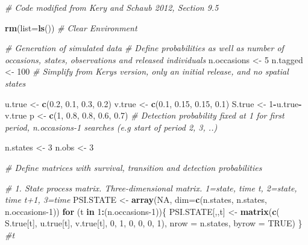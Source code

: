 \documentclass[
]{krantz}
\makeatletter
\newenvironment{Shaded}{\begin{snugshade}}{\end{snugshade}}
\newcommand{\AttributeTok}[1]{\textcolor[rgb]{0.27,0.27,0.27}{#1}}
\newcommand{\CommentTok}[1]{\textcolor[rgb]{0.37,0.37,0.37}{\textit{#1}}}
\newcommand{\ConstantTok}[1]{\textcolor[rgb]{0.37,0.37,0.37}{#1}}
\newcommand{\ControlFlowTok}[1]{\textcolor[rgb]{0.27,0.27,0.27}{\textbf{#1}}}
\newcommand{\DecValTok}[1]{\textcolor[rgb]{0.06,0.06,0.06}{#1}}
\newcommand{\FloatTok}[1]{\textcolor[rgb]{0.06,0.06,0.06}{#1}}
\newcommand{\FunctionTok}[1]{\textcolor[rgb]{0.27,0.27,0.27}{\textbf{#1}}}
\newcommand{\NormalTok}[1]{#1}
\newcommand{\OtherTok}[1]{\textcolor[rgb]{0.37,0.37,0.37}{#1}}
\newcommand{\SpecialCharTok}[1]{\textcolor[rgb]{0.43,0.43,0.43}{\textbf{#1}}}
\newenvironment{kframe}{%
\medskip{}
\setlength{\fboxsep}{.8em}
 \def\at@end@of@kframe{}%
 \ifinner\ifhmode%
  \def\at@end@of@kframe{\end{minipage}}%
  \begin{minipage}{\columnwidth}%
 \fi\fi%
 \def\FrameCommand##1{\hskip\@totalleftmargin \hskip-\fboxsep
 \colorbox{shadecolor}{##1}\hskip-\fboxsep
     \hskip-\linewidth \hskip-\@totalleftmargin \hskip\columnwidth}%
 \MakeFramed {\advance\hsize-\width
   \@totalleftmargin\z@ \linewidth\hsize
   \@setminipage}}%
 {\par\unskip\endMakeFramed%
 \at@end@of@kframe}
\renewenvironment{Shaded}{\begin{kframe}}{\end{kframe}}
\makeatother
\begin{document}
\begin{Shaded}
\begin{Highlighting}[]
\CommentTok{\# Code modified from Kery and Schaub 2012, Section 9.5}

\FunctionTok{rm}\NormalTok{(}\AttributeTok{list=}\FunctionTok{ls}\NormalTok{()) }\CommentTok{\# Clear Environment}

\CommentTok{\# Generation of simulated data}
\CommentTok{\# Define probabilities as well as number of occasions, states, observations and released individuals}
\NormalTok{n.occasions }\OtherTok{\textless{}{-}} \DecValTok{5}
\NormalTok{n.tagged }\OtherTok{\textless{}{-}} \DecValTok{100}  \CommentTok{\# Simplify from Kery\textquotesingle{}s version, only an initial release, and no spatial states}

\NormalTok{u.true }\OtherTok{\textless{}{-}} \FunctionTok{c}\NormalTok{(}\FloatTok{0.2}\NormalTok{, }\FloatTok{0.1}\NormalTok{, }\FloatTok{0.3}\NormalTok{, }\FloatTok{0.2}\NormalTok{)}
\NormalTok{v.true }\OtherTok{\textless{}{-}} \FunctionTok{c}\NormalTok{(}\FloatTok{0.1}\NormalTok{, }\FloatTok{0.15}\NormalTok{, }\FloatTok{0.15}\NormalTok{, }\FloatTok{0.1}\NormalTok{)}
\NormalTok{S.true }\OtherTok{\textless{}{-}} \DecValTok{1}\SpecialCharTok{{-}}\NormalTok{u.true}\SpecialCharTok{{-}}\NormalTok{v.true}
\NormalTok{p }\OtherTok{\textless{}{-}} \FunctionTok{c}\NormalTok{(}\DecValTok{1}\NormalTok{, }\FloatTok{0.8}\NormalTok{, }\FloatTok{0.8}\NormalTok{, }\FloatTok{0.6}\NormalTok{, }\FloatTok{0.7}\NormalTok{)}
\CommentTok{\#  Detection probability fixed at 1 for first period, n.occasions{-}1 searches (e.g start of period 2, 3, ..)}

\NormalTok{n.states }\OtherTok{\textless{}{-}} \DecValTok{3}
\NormalTok{n.obs }\OtherTok{\textless{}{-}} \DecValTok{3}

\CommentTok{\# Define matrices with survival, transition and detection probabilities}

\CommentTok{\# 1. State process matrix. Three{-}dimensional matrix. 1=state, time t, 2=state, time t+1, 3=time}
\NormalTok{PSI.STATE }\OtherTok{\textless{}{-}} \FunctionTok{array}\NormalTok{(}\ConstantTok{NA}\NormalTok{, }\AttributeTok{dim=}\FunctionTok{c}\NormalTok{(n.states, n.states, n.occasions}\DecValTok{{-}1}\NormalTok{))}
   \ControlFlowTok{for}\NormalTok{ (t }\ControlFlowTok{in} \DecValTok{1}\SpecialCharTok{:}\NormalTok{(n.occasions}\DecValTok{{-}1}\NormalTok{))\{}
\NormalTok{      PSI.STATE[,,t] }\OtherTok{\textless{}{-}} \FunctionTok{matrix}\NormalTok{(}\FunctionTok{c}\NormalTok{(}
\NormalTok{      S.true[t], u.true[t], v.true[t],}
      \DecValTok{0}\NormalTok{, }\DecValTok{1}\NormalTok{, }\DecValTok{0}\NormalTok{,}
      \DecValTok{0}\NormalTok{, }\DecValTok{0}\NormalTok{, }\DecValTok{1}\NormalTok{), }\AttributeTok{nrow =}\NormalTok{ n.states, }\AttributeTok{byrow =} \ConstantTok{TRUE}\NormalTok{)}
\NormalTok{      \} }\CommentTok{\#t}


\end{Highlighting}
\end{Shaded}
\end{document}
